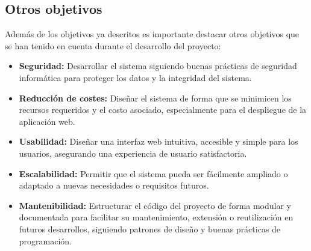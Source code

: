 \subsection{Otros objetivos}
Además de los objetivos ya descritos es importante destacar otros objetivos que se han tenido en cuenta durante el desarrollo del proyecto:
\begin{itemize}
    \item \textbf{Seguridad:} Desarrollar el sistema siguiendo buenas prácticas de seguridad informática para proteger los datos y la integridad del sistema.
    \item \textbf{Reducción de costes:} Diseñar el sistema de forma que se minimicen los recursos requeridos y el costo asociado, especialmente para el despliegue de la aplicación web.
    \item \textbf{Usabilidad:} Diseñar una interfaz web intuitiva, accesible y simple para los usuarios, asegurando una experiencia de usuario satisfactoria.
    \item \textbf{Escalabilidad:} Permitir que el sistema pueda ser fácilmente ampliado o adaptado a nuevas necesidades o requisitos futuros.
    \item \textbf{Mantenibilidad:} Estructurar el código del proyecto de forma modular y documentada para facilitar su mantenimiento, extensión o reutilización en futuros desarrollos, siguiendo patrones de diseño y buenas prácticas de programación.
\end{itemize}
